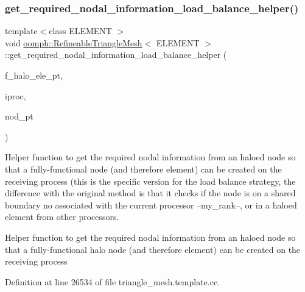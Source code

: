 \subsubsection{\texorpdfstring{get\+\_\+required\+\_\+nodal\+\_\+information\+\_\+load\+\_\+balance\+\_\+helper()}{get\_required\_nodal\_information\_load\_balance\_helper()}}
{\footnotesize\ttfamily template$<$class E\+L\+E\+M\+E\+NT $>$ \\
void \hyperlink{classoomph_1_1RefineableTriangleMesh}{oomph\+::\+Refineable\+Triangle\+Mesh}$<$ E\+L\+E\+M\+E\+NT $>$\+::get\+\_\+required\+\_\+nodal\+\_\+information\+\_\+load\+\_\+balance\+\_\+helper (\begin{DoxyParamCaption}\item[{\hyperlink{classoomph_1_1Vector}{Vector}$<$ \hyperlink{classoomph_1_1Vector}{Vector}$<$ \hyperlink{classoomph_1_1FiniteElement}{Finite\+Element} $\ast$$>$ $>$ \&}]{f\+\_\+halo\+\_\+ele\+\_\+pt,  }\item[{unsigned \&}]{iproc,  }\item[{\hyperlink{classoomph_1_1Node}{Node} $\ast$}]{nod\+\_\+pt }\end{DoxyParamCaption})\hspace{0.3cm}{\ttfamily [protected]}}



Helper function to get the required nodal information from an haloed node so that a fully-\/functional node (and therefore element) can be created on the receiving process (this is the specific version for the load balance strategy, the difference with the original method is that it checks if the node is on a shared boundary no associated with the current processor --my\+\_\+rank--, or in a haloed element from other processors. 

Helper function to get the required nodal information from an haloed node so that a fully-\/functional halo node (and therefore element) can be created on the receiving process 

Definition at line 26534 of file triangle\+\_\+mesh.\+template.\+cc.



